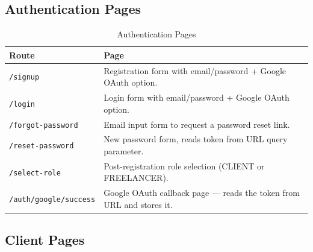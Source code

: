 \subsection{Authentication Pages}

\begin{table}[H]
\centering
\caption{Authentication Pages}
\begin{tabularx}{\textwidth}{lX}
\toprule
\textbf{Route} & \textbf{Page} \\
\midrule
\texttt{/signup}            & Registration form with email/password + Google OAuth option. \\
\texttt{/login}             & Login form with email/password + Google OAuth option. \\
\texttt{/forgot-password}   & Email input form to request a password reset link. \\
\texttt{/reset-password}    & New password form, reads token from URL query parameter. \\
\texttt{/select-role}       & Post-registration role selection (CLIENT or FREELANCER). \\
\texttt{/auth/google/success} & Google OAuth callback page --- reads the token from URL and stores it. \\
\bottomrule
\end{tabularx}
\end{table}

\subsection{Client Pages}

